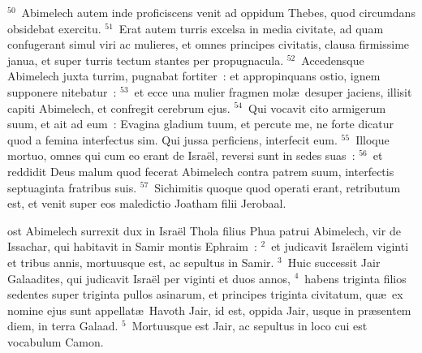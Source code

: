 ${}^{50}$~Abimelech autem inde proficiscens venit ad oppidum Thebes, quod circumdans obsidebat exercitu.
${}^{51}$~Erat autem turris excelsa in media civitate, ad quam confugerant simul viri ac mulieres, et omnes principes civitatis, clausa firmissime janua, et super turris tectum stantes per propugnacula.
${}^{52}$~Accedensque Abimelech juxta turrim, pugnabat fortiter~: et appropinquans ostio, ignem supponere nitebatur~:
${}^{53}$~et ecce una mulier fragmen mol\ae\ desuper jaciens, illisit capiti Abimelech, et confregit cerebrum ejus.
${}^{54}$~Qui vocavit cito armigerum suum, et ait ad eum~: Evagina gladium tuum, et percute me, ne forte dicatur quod a femina interfectus sim. Qui jussa perficiens, interfecit eum.
${}^{55}$~Illoque mortuo, omnes qui cum eo erant de Isra\"el, reversi sunt in sedes suas~:
${}^{56}$~et reddidit Deus malum quod fecerat Abimelech contra patrem suum, interfectis septuaginta fratribus suis.
${}^{57}$~Sichimitis quoque quod operati erant, retributum est, et venit super eos maledictio Joatham filii Jerobaal.

\bchapter
{}ost Abimelech surrexit dux in Isra\"el Thola filius Phua patrui Abimelech, vir de Issachar, qui habitavit in Samir montis Ephraim~:
${}^{2}$~et judicavit Isra\"elem viginti et tribus annis, mortuusque est, ac sepultus in Samir.
${}^{3}$~Huic successit Jair Galaadites, qui judicavit Isra\"el per viginti et duos annos,
${}^{4}$~habens triginta filios sedentes super triginta pullos asinarum, et principes triginta civitatum, qu\ae\ ex nomine ejus sunt appellat\ae\ Havoth Jair, id est, oppida Jair, usque in pr\ae sentem diem, in terra Galaad.
${}^{5}$~Mortuusque est Jair, ac sepultus in loco cui est vocabulum Camon.



